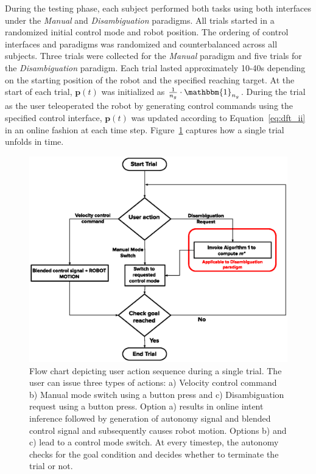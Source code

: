 \documentclass[journal]{IEEEtran}
\begin{document}
During the testing phase, each subject performed both tasks using both interfaces under the \textit{Manual} and \textit{Disambiguation} paradigms. All trials started in a randomized initial control mode and robot position. The ordering of control interfaces and paradigms was randomized and counterbalanced across all subjects. Three trials were collected for the \textit{Manual} paradigm and five trials for the \textit{Disambiguation} paradigm. Each trial lasted approximately 10-40s depending on the starting position of the robot and the specified reaching target. At the start of each trial, $\boldsymbol{p}(t)$ was initialized as $\frac{1}{n_g}\cdot\mathbbm{1}_{n_g}$. During the trial as the user teleoperated the robot by generating control commands using the specified control interface, $\boldsymbol{p}(t)$ was updated according to Equation~\ref{eq:dft_ii} in an online fashion at each time step. Figure~\ref{fig:exp_block_diagram} captures how a single trial unfolds in time.

\begin{figure}[ht!]
	\centering
	\includegraphics[keepaspectratio, width = 1.\hsize, height = 0.4\vsize, left]{./figures/ExperimentBlockDiagram.eps}
	\caption{Flow chart depicting user action sequence during a single trial. The user can issue three types of actions: a) Velocity control command b) Manual mode switch using a button press and c) Disambiguation request using a button press. Option a) results in online intent inference followed by generation of autonomy signal and blended control signal and subsequently causes robot motion. Options b) and c) lead to a control mode switch. At every timestep, the autonomy checks for the goal condition and decides whether to terminate the trial or not.}
	\label{fig:exp_block_diagram}
\end{figure}
\end{document}
